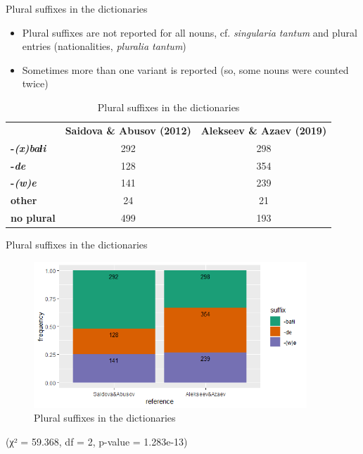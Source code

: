 \begin{frame}{Plural suffixes in the dictionaries}
\begin{itemize}
    \item Plural suffixes are not reported for all nouns, cf. \textit{singularia tantum} and plural entries (nationalities, \textit{pluralia tantum})
    \item Sometimes more than one variant is reported (so, some nouns were counted twice)
\end{itemize}
\begin{table}[]
\caption{Plural suffixes in the dictionaries}
\centering
\begin{tabular}{lcc}
          & \multicolumn{1}{l}{\textbf{Saidova \& Abusov (2012)}} & \multicolumn{1}{l}{\textbf{Alekseev \& Azaev (2019)}} \\
\textbf{-\textit{(x)baɬi}}  & 292                                          & 298                                          \\
\textbf{-\textit{de}}       & 128                                          & 354                                          \\
\textbf{-\textit{(w)e}}     & 141                                          & 239                                          \\
\textbf{other}     & 24                                           & 21                                           \\
\textbf{no plural} & 499                                          & 193                                         
\end{tabular}
\end{table}
\end{frame}

\begin{frame}{Plural suffixes in the dictionaries}
\begin{figure}[h]
\caption{Plural suffixes in the dictionaries}
\centering
\includegraphics[height=5.5cm]{images/plural.png}
\end{figure}
\centering
\small (χ² = 59.368, df = 2, p-value = 1.283e-13)
\end{frame}

